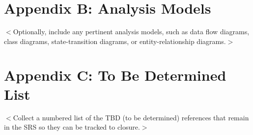 \documentclass{scrreprt}
\begin{document}
\section{Appendix B: Analysis Models}
$<$Optionally, include any pertinent analysis models, such as data flow 
diagrams, class diagrams, state-transition diagrams, or entity-relationship 
diagrams.$>$

\section{Appendix C: To Be Determined List}
$<$Collect a numbered list of the TBD (to be determined) references that remain 
in the SRS so they can be tracked to closure.$>$
\end{document}
